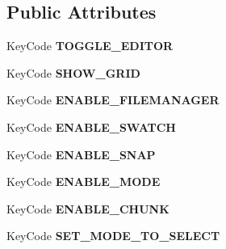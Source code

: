 \subsection*{Public Attributes}
\begin{DoxyCompactItemize}
\item 
Key\+Code {\bfseries T\+O\+G\+G\+L\+E\+\_\+\+E\+D\+I\+T\+OR}\hypertarget{class_v_m_e_settings_object_af10d9ba9f0742bf067f191b605d29aae}{}\label{class_v_m_e_settings_object_af10d9ba9f0742bf067f191b605d29aae}

\item 
Key\+Code {\bfseries S\+H\+O\+W\+\_\+\+G\+R\+ID}\hypertarget{class_v_m_e_settings_object_ab66e84857309b514c3192e7a03bdc991}{}\label{class_v_m_e_settings_object_ab66e84857309b514c3192e7a03bdc991}

\item 
Key\+Code {\bfseries E\+N\+A\+B\+L\+E\+\_\+\+F\+I\+L\+E\+M\+A\+N\+A\+G\+ER}\hypertarget{class_v_m_e_settings_object_ad75067fc238b62e690ddf0841efab9c7}{}\label{class_v_m_e_settings_object_ad75067fc238b62e690ddf0841efab9c7}

\item 
Key\+Code {\bfseries E\+N\+A\+B\+L\+E\+\_\+\+S\+W\+A\+T\+CH}\hypertarget{class_v_m_e_settings_object_a0eae2f029a72b9d33127e680d4cc6e6c}{}\label{class_v_m_e_settings_object_a0eae2f029a72b9d33127e680d4cc6e6c}

\item 
Key\+Code {\bfseries E\+N\+A\+B\+L\+E\+\_\+\+S\+N\+AP}\hypertarget{class_v_m_e_settings_object_a12cfe16fd387974eb5879f76d3ecda2e}{}\label{class_v_m_e_settings_object_a12cfe16fd387974eb5879f76d3ecda2e}

\item 
Key\+Code {\bfseries E\+N\+A\+B\+L\+E\+\_\+\+M\+O\+DE}\hypertarget{class_v_m_e_settings_object_a2581343dea940a6516bafcd2a02333bf}{}\label{class_v_m_e_settings_object_a2581343dea940a6516bafcd2a02333bf}

\item 
Key\+Code {\bfseries E\+N\+A\+B\+L\+E\+\_\+\+C\+H\+U\+NK}\hypertarget{class_v_m_e_settings_object_a691a279a65ce047d9b939ab131c113ad}{}\label{class_v_m_e_settings_object_a691a279a65ce047d9b939ab131c113ad}

\item 
Key\+Code {\bfseries S\+E\+T\+\_\+\+M\+O\+D\+E\+\_\+\+T\+O\+\_\+\+S\+E\+L\+E\+CT}\hypertarget{class_v_m_e_settings_object_adc35cd06e0f07c5118ad57089e89d2ba}{}\label{class_v_m_e_settings_object_adc35cd06e0f07c5118ad57089e89d2ba}


\end{DoxyCompactItemize}
